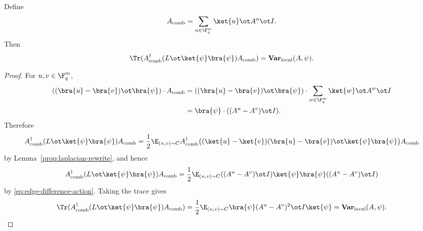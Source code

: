 \begin{lemma}\label{lem:local-rewrite}
	\leanok
	Define
	\[
		A_{\mathrm{comb}} = \sum_{u \in \F_q^m} \ket{u} \ot A^u \ot I.
	\]
	Then
	\[
		\Tr(A_{\mathrm{comb}}^\dagger (L \ot \ket{\psi}\bra{\psi}) A_{\mathrm{comb}})
		= \mathbf{Var}_{\mathrm{local}}(A,\psi).
	\]
\end{lemma}
\begin{proof}
	\leanok
	For $u,v \in \F_q^m$,
	\begin{equation}
		\begin{aligned}
			((\bra{u}-\bra{v}) \ot \bra{\psi}) \cdot A_{\mathrm{comb}}
			 & =
			((\bra{u}-\bra{v}) \ot \bra{\psi}) \cdot \sum_{w \in \F_q^m} \ket{w} \ot A^w \ot I \\
			 & =
			\bra{\psi} \cdot ((A^u-A^v)\ot I).
		\end{aligned}
		\label{eq:edge-difference-action}
	\end{equation}
	Therefore
	\[
		A_{\mathrm{comb}}^\dagger (L \ot \ket{\psi}\bra{\psi}) A_{\mathrm{comb}}
		=
		\frac12 \E_{(u,v)\sim C} A_{\mathrm{comb}}^\dagger \bigl((\ket{u}-\ket{v})(\bra{u}-\bra{v}) \ot \ket{\psi}\bra{\psi}\bigr) A_{\mathrm{comb}}
	\]
	by Lemma~\ref{prop:laplacian-rewrite}, and hence
	\[
		A_{\mathrm{comb}}^\dagger (L \ot \ket{\psi}\bra{\psi}) A_{\mathrm{comb}}
		=
		\frac12 \E_{(u,v)\sim C} ((A^u-A^v)\ot I)\ket{\psi}\bra{\psi}((A^u-A^v)\ot I)
	\]
	by \eqref{eq:edge-difference-action}. Taking the trace gives
	\[
		\Tr(A_{\mathrm{comb}}^\dagger (L \ot \ket{\psi}\bra{\psi}) A_{\mathrm{comb}})
		=
		\frac12 \E_{(u,v)\sim C} \bra{\psi} (A^u-A^v)^2 \ot I \ket{\psi}
		=
		\mathbf{Var}_{\mathrm{local}}(A,\psi).
	\]
\end{proof}

